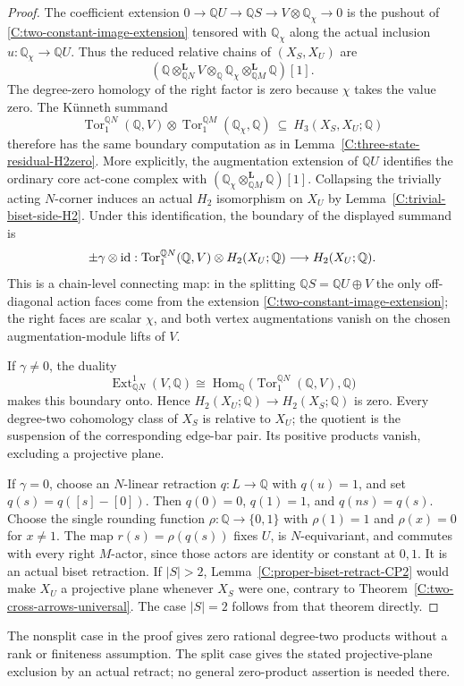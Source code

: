 \begin{proof}
The coefficient extension
$0\to\mathbb QU\to\mathbb QS\to V\otimes\mathbb Q_\chi\to0$
is the pushout of \eqref{C:two-constant-image-extension}
tensored with $\mathbb Q_\chi$ along the actual inclusion
$u:\mathbb Q_\chi\to\mathbb QU$.
Thus the reduced relative chains of $(X_S,X_U)$ are
\[
 \left(
  \mathbb Q\otimes^{\mathbf L}_{\mathbb QN}V
  \otimes_{\mathbb Q}
  \mathbb Q_\chi\otimes^{\mathbf L}_{\mathbb QM}\mathbb Q
 \right)[1].
\]
The degree-zero homology of the right factor is zero because
$\chi$ takes the value zero.  The K\"unneth summand
\[
 \operatorname{Tor}^{\mathbb QN}_1(\mathbb Q,V)
 \otimes
 \operatorname{Tor}^{\mathbb QM}_1(\mathbb Q_\chi,\mathbb Q)
 \ \subseteq\ H_3(X_S,X_U;\mathbb Q)
\]
therefore has the same boundary computation as in
Lemma~\ref{C:three-state-residual-H2zero}.
More explicitly, the augmentation extension of $\mathbb QU$
identifies the ordinary core act-cone complex with
$(\mathbb Q_\chi\otimes^{\mathbf L}_{\mathbb QM}\mathbb Q)[1]$.
Collapsing the trivially acting $N$-corner induces an actual
$H_2$ isomorphism on $X_U$ by
Lemma~\ref{C:trivial-biset-side-H2}.  Under this identification,
the boundary of the displayed summand is
\[
 \pm\gamma\otimes\mathrm {id}:
 \operatorname{Tor}^{\mathbb QN}_1(\mathbb Q,V)
 \otimes H_2(X_U;\mathbb Q)
 \longrightarrow H_2(X_U;\mathbb Q).
\]
This is a chain-level connecting map: in the splitting
$\mathbb QS=\mathbb QU\oplus V$ the only off-diagonal action
faces come from the extension \eqref{C:two-constant-image-extension};
the right faces are scalar $\chi$, and both vertex augmentations
vanish on the chosen augmentation-module lifts of $V$.

If $\gamma\ne0$, the duality
\[
 \operatorname{Ext}^1_{\mathbb QN}(V,\mathbb Q)
  \cong
 \operatorname{Hom}_{\mathbb Q}
 \bigl(\operatorname{Tor}^{\mathbb QN}_1(\mathbb Q,V),\mathbb Q\bigr)
\]
makes this boundary onto.  Hence $H_2(X_U;\mathbb Q)\to
H_2(X_S;\mathbb Q)$ is zero.  Every degree-two cohomology
class of $X_S$ is relative to $X_U$; the quotient is the
suspension of the corresponding edge-bar pair.  Its positive
products vanish, excluding a projective plane.

If $\gamma=0$, choose an $N$-linear retraction
$q:L\to\mathbb Q$ with $q(u)=1$, and set
$q(s)=q([s]-[0])$.  Then $q(0)=0$, $q(1)=1$, and $q(ns)=q(s)$.
Choose the single rounding function
$\rho:\mathbb Q\to\{0,1\}$ with $\rho(1)=1$ and
$\rho(x)=0$ for $x\ne1$.  The map $r(s)=\rho(q(s))$ fixes
$U$, is $N$-equivariant, and commutes with every right
$M$-actor, since those actors are identity or constant at
$0,1$.  It is an actual biset retraction.
If $|S|>2$, Lemma~\ref{C:proper-biset-retract-CP2} would make
$X_U$ a projective plane whenever $X_S$ were one, contrary
to Theorem~\ref{C:two-cross-arrows-universal}.  The case
$|S|=2$ follows from that theorem directly.
\end{proof}

\begin{remark}\label{C:two-constant-image-scope}
The nonsplit case in the proof gives zero rational
degree-two products without a rank or finiteness assumption.
The split case gives the stated projective-plane exclusion
by an actual retract; no general zero-product assertion is
needed there.
\end{remark}
